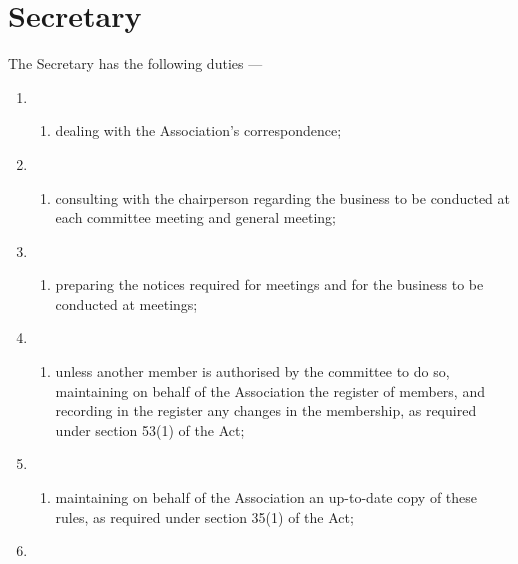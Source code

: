 \hypertarget{secretary}{%
\section{Secretary}\label{secretary}}

The Secretary has the following duties ---

\begin{enumerate}
\item \begin{enumerate}
  \def\labelenumi{\alph{enumi})}
  
  \item dealing with the Association's correspondence;
  \end{enumerate}
\item \begin{enumerate}
  \def\labelenumi{\alph{enumi})}
  \setcounter{enumi}{1}
  
  \item consulting with the chairperson regarding the business to be conducted at each committee meeting and general meeting;
  \end{enumerate}
\item \begin{enumerate}
  \def\labelenumi{\alph{enumi})}
  \setcounter{enumi}{2}
  
  \item preparing the notices required for meetings and for the business to be conducted at meetings;
  \end{enumerate}
\item \begin{enumerate}
  \def\labelenumi{\alph{enumi})}
  \setcounter{enumi}{3}
  
  \item unless another member is authorised by the committee to do so, maintaining on behalf of the Association the register of members, and recording in the register any changes in the membership, as required under section 53(1) of the Act;
  \end{enumerate}
\item \begin{enumerate}
  \def\labelenumi{\alph{enumi})}
  \setcounter{enumi}{4}
  
  \item maintaining on behalf of the Association an up-to-date copy of these rules, as required under section 35(1) of the Act;
  \end{enumerate}
\item \begin{enumerate}
  \def\labelenumi{\alph{enumi})}
  \setcounter{enumi}{5}
  

\end{enumerate}
\end{enumerate}
